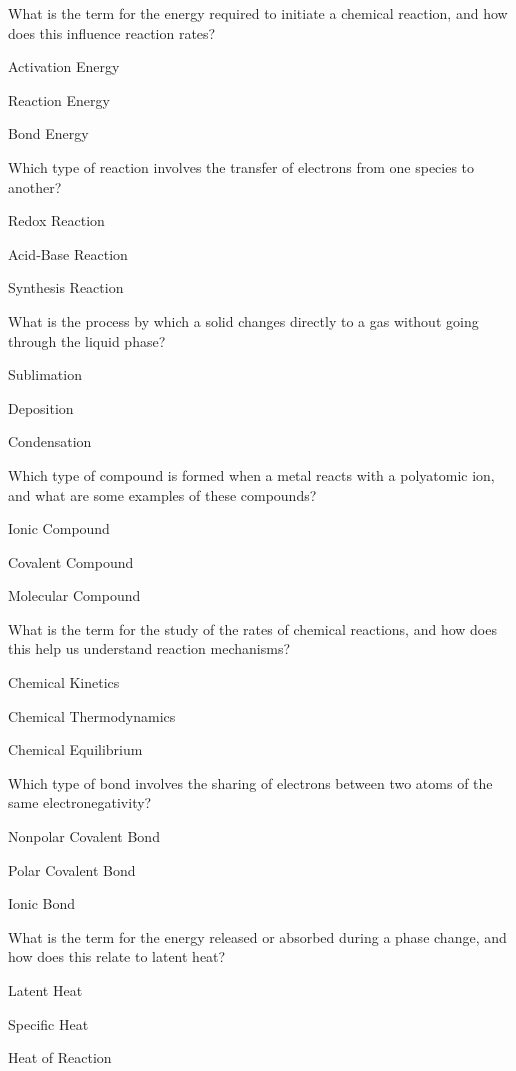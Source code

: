 \begin{enhancedmcq}{What is the term for the energy required to initiate a chemical reaction, and how does this influence reaction rates?}
\item Activation Energy
\item Reaction Energy
\item Bond Energy

\end{enhancedmcq}
\begin{enhancedmcq}{Which type of reaction involves the transfer of electrons from one species to another?}
\item Redox Reaction
\item Acid‑Base Reaction
\item Synthesis Reaction

\end{enhancedmcq}
\begin{enhancedmcq}{What is the process by which a solid changes directly to a gas without going through the liquid phase?}
\item Sublimation
\item Deposition
\item Condensation

\end{enhancedmcq}
\begin{enhancedmcq}{Which type of compound is formed when a metal reacts with a polyatomic ion, and what are some examples of these compounds?}
\item Ionic Compound
\item Covalent Compound
\item Molecular Compound

\end{enhancedmcq}
\begin{enhancedmcq}{What is the term for the study of the rates of chemical reactions, and how does this help us understand reaction mechanisms?}
\item Chemical Kinetics
\item Chemical Thermodynamics
\item Chemical Equilibrium

\end{enhancedmcq}
\begin{enhancedmcq}{Which type of bond involves the sharing of electrons between two atoms of the same electronegativity?}
\item Nonpolar Covalent Bond
\item Polar Covalent Bond
\item Ionic Bond

\end{enhancedmcq}
\begin{enhancedmcq}{What is the term for the energy released or absorbed during a phase change, and how does this relate to latent heat?}
\item Latent Heat
\item Specific Heat
\item Heat of Reaction
\end{enhancedmcq}